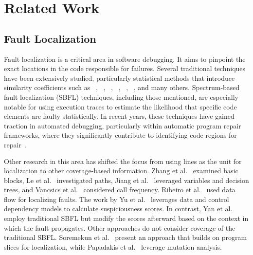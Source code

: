\section{Related Work}
%
\label{sec:related-work}

\subsection{Fault Localization}%
\label{sub:related-fault-localization}

Fault localization is a critical area in software debugging.
It aims to pinpoint the exact locations in the code responsible for failures.
Several traditional techniques have been extensively studied, particularly statistical methods that introduce similarity coefficients such as \TARANTULA{}~\cite{jones2005tarantula}, \OCHIAI{}~\cite{abreu2006ochiai}, \DSTAR{}~\cite{wong2012dstar}, \GP{}~\cite{xie2013gp}, \AMPLE{}~\cite{dallmeier2005ample}, \JACCARD{}~\cite{chen2002jaccard}, and many others.
Spectrum-based fault localization (SBFL) techniques, including those mentioned, are especially notable for using execution traces to estimate the likelihood that specific code elements are faulty statistically.
In recent years, these techniques have gained traction in automated debugging, particularly within automatic program repair frameworks, where they significantly contribute to identifying code regions for repair~\cite{qi2013apr,lutellier2020coconut}.

Other research in this area has shifted the focus from using lines as the unit for localization to other coverage-based information.
Zhang et al.~\cite{zhang2009capturing} examined basic blocks, Le et al.~\cite{le2010path} investigated paths, Jiang et al.~\cite{jiang2023variable} leveraged variables and decision trees, and Vancsics et al.~\cite{vancsics2021calls} considered call frequency.
Ribeiro et al.~\cite{ribeiro2019dataflow} used data flow for localizing faults.
The work by Yu et al.~\cite{yu2011models} leverages data and control dependency models to calculate suspiciousness scores.
In contrast, Yan et al.~\cite{yan2023context} employ traditional SBFL but modify the scores afterward based on the context in which the fault propagates.
Other approaches do not consider coverage of the traditional SBFL.
Soremekun et al.~\cite{soremekun2021slicing} present an approach that builds on program slices for localization, while Papadakis et al.~\cite{papadakis2014mutation,papadakis2015mutation} leverage mutation analysis.

